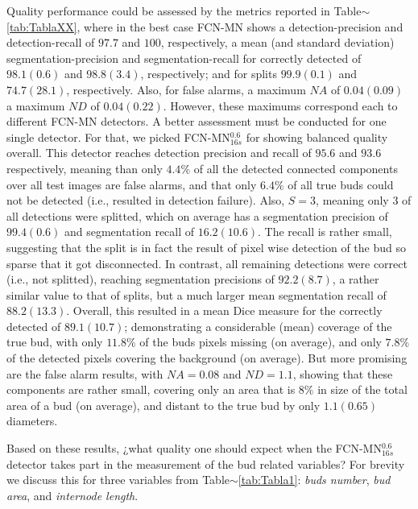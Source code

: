 \documentclass[a4paper,authoryear,review]{elsarticle}
\begin{document}
	Quality performance could be assessed by the metrics reported in  Table$\sim$\ref{tab:TablaXX}, where in the best case FCN-MN shows a  detection-precision and detection-recall of $97.7$ and $100$, respectively, a mean (and standard deviation) segmentation-precision and segmentation-recall for correctly detected of $98.1(0.6)$ and $98.8(3.4)$, respectively; and for splits $99.9(0.1)$ and $74.7(28.1)$, respectively. Also, for false alarms, a maximum  $NA$ of $0.04(0.09)$ a maximum $ND$ of $0.04 (0.22)$.  
	However, these maximums correspond each to different FCN-MN detectors. A better assessment must be conducted for one single detector. For that, we picked FCN-MN$_{16s}^{0.6}$ for showing balanced quality overall. This detector reaches detection precision and recall of $95.6$ and $93.6$ respectively, meaning than only $4.4\%$ of all the detected connected components over all test images are false alarms, and that only $6.4\%$ of all true buds could not be detected (i.e., resulted in detection failure).
	Also, $S=3$, meaning only $3$ of all detections were splitted, which on average has a segmentation precision of $99.4(0.6)$ and segmentation recall of $16.2(10.6)$. The recall is rather small, suggesting that the split is in fact the result of pixel wise detection of the bud so sparse that it got disconnected. In contrast, all remaining detections were correct (i.e., not splitted), reaching segmentation precisions of $92.2(8.7)$, a rather similar value to that of splits, but a much larger mean segmentation recall of $88.2(13.3)$. Overall, this resulted in a mean Dice measure for the correctly detected of $89.1(10.7)$; demonstrating a considerable (mean) coverage of the true bud, with only $11.8\%$ of the buds pixels missing (on average), and only $7.8\%$ of the detected pixels covering the background (on average).
	But more promising are the false alarm results, with $NA=0.08$ and $ND=1.1$, showing that these components are rather small, covering only an area that is $8\%$ in size of the total area of a bud (on average), and distant to the true bud by only $1.1 (0.65)$ diameters.
	
	Based on these results, ¿what quality one should expect when the FCN-MN$_{16s}^{0.6}$ detector takes part in the measurement of the bud related variables? For brevity we discuss this  for three variables from Table$\sim$\ref{tab:Tabla1}: \emph{buds number}, \emph{bud area}, and \emph{internode length}.
	
\end{document}
